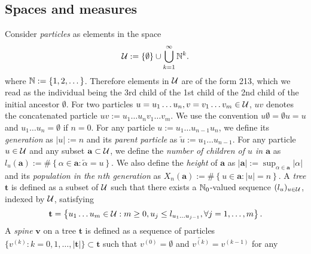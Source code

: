 \documentclass[12pt]{amsart}
\numberwithin{equation}{section}
\newcommand{\defn}[1]{{\em #1}}
\newcommand{\abs}[1]{\left| #1 \right|}
\newcommand{\set}[1]{\left\{ #1 \right\}}
\newcommand{\parent}[1]{\overleftarrow{#1}}
\newcommand{\tree}{\mathbf t}
\newcommand{\spine}{\mathbf v}
\begin{document}
\subsection{Spaces and measures}
\label{sec:spacesandmeasures}
	Consider \defn{particles} as elements in the space
\begin{equation*}
		\cU
	:=
		\set{\emptyset}\cup\bigcup_{k=1}^\infty \bbN^k.
\end{equation*}
	where 
	$\mathbb N:=\{1,2,\dots\}$. 
	Therefore elements in $\mathcal U$ are of the form 213, which we read as the individual being the 3rd child of the 1st child of the 2nd child of the initial ancestor $\emptyset$. 
	For two particles 
	$u=u_1\dots u_n, v=v_1\dots v_m\in\mathcal U$,
	$uv$ denotes the concatenated particle 
	$uv:=u_1\dots u_nv_1\dots v_m$.
	We use the convention $u\emptyset = \emptyset u = u$ 
	and $u_1\dots u_n=\emptyset$ if $n=0$.
	For any particle 
	$u:=u_1\dots u_{n-1}u_n$, we define its \defn{generation} as $\abs{u}:=n$ and its \defn{parent particle} as 
	$\parent{u}:=u_1\dots u_{n-1}$.
	For any particle $u\in\mathcal U$ and any subset $\mathbf a\subset\mathcal U$, we define the 
	\defn{number of children of $u$ in $\mathbf a$} 
	as $l_u(\mathbf a) := \#\set{\alpha\in \mathbf a:\parent{\alpha}=u} $. 
	We also define the \defn{height} of $\mathbf a$ as $|\mathbf a|:=\sup_{\alpha\in \mathbf a}|\alpha|$ and its \defn{population in the $n$th generation} as $X_n(\mathbf a):=\#\set{u\in \mathbf a:|u|=n}$. 
	A \defn{tree} $\tree$ is defined as a subset of $\mathcal U$ such that there exists a $\mathbb N_0$-valued sequence $(l_u)_{u\in \mathcal U}$, indexed by $\mathcal U$, satisfying
\begin{equation*}
		\tree
	=
        \set{u_1\dots u_m\in \cU: m\ge 0, u_j\leq l_{u_1\dots u_{j-1}}, \forall  j=1,\dots,m}.
\end{equation*}
	A \defn{spine} $\spine$ on a  tree $\tree$ is defined as a sequence of particles 
	$\{v^{(k)}:k=0,1,\dots,|\tree|\}\subset\tree$
	such that $v^{(0)}=\emptyset$ and $\parent{v^{(k)}}=v^{(k-1)}$ for any %
\end{document}
